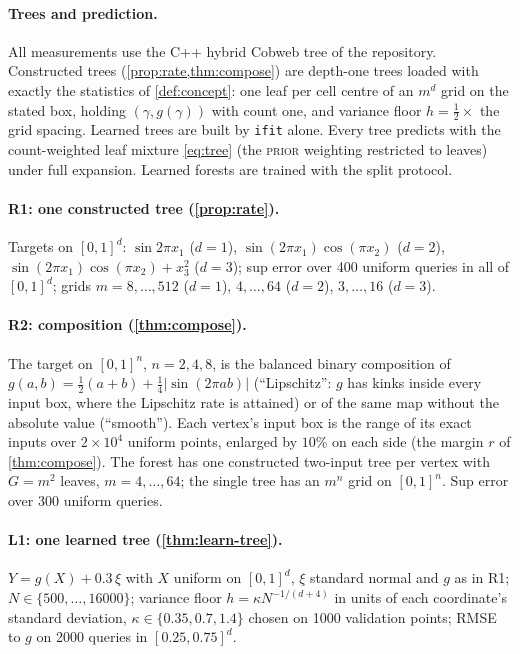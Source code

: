 \paragraph{Trees and prediction.}
All measurements use the C++ hybrid Cobweb tree of the repository.  Constructed trees
(\cref{prop:rate,thm:compose}) are depth-one trees loaded with exactly the statistics of
\cref{def:concept}: one leaf per cell centre of an $m^d$ grid on the stated box, holding
$(\gamma,g(\gamma))$ with count one, and variance floor $h=\tfrac12\times$ the grid spacing.
Learned trees are built by \texttt{ifit} alone.  Every tree predicts with the
count-weighted leaf mixture \eqref{eq:tree} (the \textsc{prior} weighting restricted to
leaves) under full expansion.  Learned forests are trained with the split protocol.

\paragraph{R1: one constructed tree (\cref{prop:rate}).}
Targets on $[0,1]^d$: $\sin2\pi x_1$ ($d=1$), $\sin(2\pi x_1)\cos(\pi x_2)$ ($d=2$),
$\sin(2\pi x_1)\cos(\pi x_2)+x_3^2$ ($d=3$); sup error over 400 uniform queries in all of
$[0,1]^d$; grids $m=8,\dots,512$ ($d=1$), $4,\dots,64$ ($d=2$), $3,\dots,16$ ($d=3$).

\paragraph{R2: composition (\cref{thm:compose}).}
The target on $[0,1]^n$, $n=2,4,8$, is the balanced binary composition of
$g(a,b)=\tfrac12(a+b)+\tfrac14|\sin(2\pi ab)|$ (``Lipschitz'': $g$ has kinks inside every
input box, where the Lipschitz rate is attained) or of the same map without the absolute
value (``smooth'').  Each vertex's input box is the range of its exact inputs over $2\times10^4$
uniform points, enlarged by $10\%$ on each side (the margin $r$ of \cref{thm:compose}).  The
forest has one constructed two-input tree per vertex with $G=m^2$ leaves, $m=4,\dots,64$;
the single tree has an $m^n$ grid on $[0,1]^n$.  Sup error over 300 uniform queries.

\paragraph{L1: one learned tree (\cref{thm:learn-tree}).}
$Y=g(X)+0.3\,\xi$ with $X$ uniform on $[0,1]^d$, $\xi$ standard normal and $g$ as in R1;
$N\in\{500,\dots,16000\}$; variance floor $h=\kappa N^{-1/(d+4)}$ in units of each
coordinate's standard deviation, $\kappa\in\{0.35,0.7,1.4\}$ chosen on 1000 validation
points; RMSE to $g$ on 2000 queries in $[0.25,0.75]^d$.


